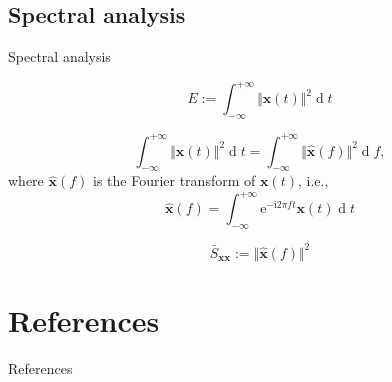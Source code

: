 \documentclass[utf-8, 10pt, aspectratio=1610]{beamer}
\begin{document}
\subsection{Spectral analysis}
\begin{frame}[allowframebreaks]{Spectral analysis}
	\begin{definition}[energy]
		\begin{equation}
			E := \int_{-\infty}^{+\infty} \Vert \mathbf{x}(t) \Vert^2 \operatorname{d}\! t
		\end{equation}
	\end{definition}
	\begin{theorem}
		\begin{equation}
			\int_{-\infty}^{+\infty} \Vert \mathbf{x}(t) \Vert^2 \operatorname{d}\! t = \int_{-\infty}^{+\infty} \Vert \hat{\mathbf{x}}(f) \Vert^2 \operatorname{d}\! f,
		\end{equation}
		where \(\hat{\mathbf{x}}(f)\) is the Fourier transform of \(\mathbf{x}(t)\), i.e.,
		\begin{equation}
			\hat{\mathbf{x}}(f) = \int_{-\infty}^{+\infty} \mathrm{e}^{-\mathrm{i}2\pi f t} \mathbf{x}(t) \operatorname{d}\! t
		\end{equation}
	\end{theorem}

	\framebreak
	\begin{definition}
		\begin{equation}
			\bar{S}_{\mathbf{xx}} := \Vert \hat{\mathbf{x}}(f) \Vert^2
		\end{equation}
	\end{definition}
\end{frame}

\appendix
\section{References}
\begin{frame}[allowframebreaks]{References}
	\printbibliography[heading=none]
\end{frame}
\end{document}
